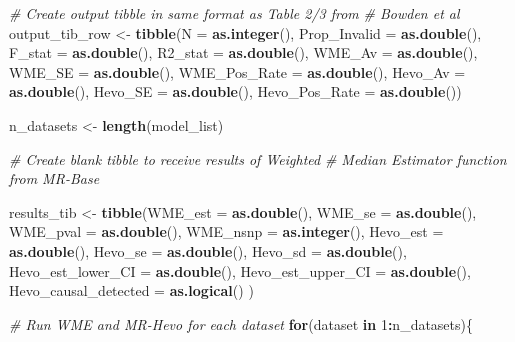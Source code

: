 \documentclass[
]{article}
\newenvironment{Shaded}{\begin{snugshade}}{\end{snugshade}}
\newcommand{\AttributeTok}[1]{\textcolor[rgb]{0.13,0.29,0.53}{#1}}
\newcommand{\CommentTok}[1]{\textcolor[rgb]{0.56,0.35,0.01}{\textit{#1}}}
\newcommand{\ControlFlowTok}[1]{\textcolor[rgb]{0.13,0.29,0.53}{\textbf{#1}}}
\newcommand{\DecValTok}[1]{\textcolor[rgb]{0.00,0.00,0.81}{#1}}
\newcommand{\FunctionTok}[1]{\textcolor[rgb]{0.13,0.29,0.53}{\textbf{#1}}}
\newcommand{\NormalTok}[1]{#1}
\newcommand{\OtherTok}[1]{\textcolor[rgb]{0.56,0.35,0.01}{#1}}
\newcommand{\SpecialCharTok}[1]{\textcolor[rgb]{0.81,0.36,0.00}{\textbf{#1}}}
\begin{document}
\begin{Shaded}
\begin{Highlighting}[]
  
  \CommentTok{\# Create output tibble in same format as Table 2/3 from}
  \CommentTok{\# Bowden et al}
\NormalTok{  output\_tib\_row }\OtherTok{\textless{}{-}} \FunctionTok{tibble}\NormalTok{(}\AttributeTok{N =} \FunctionTok{as.integer}\NormalTok{(),}
                           \AttributeTok{Prop\_Invalid =} \FunctionTok{as.double}\NormalTok{(),}
                           \AttributeTok{F\_stat =} \FunctionTok{as.double}\NormalTok{(),}
                           \AttributeTok{R2\_stat =} \FunctionTok{as.double}\NormalTok{(),}
                           \AttributeTok{WME\_Av =} \FunctionTok{as.double}\NormalTok{(),}
                           \AttributeTok{WME\_SE =} \FunctionTok{as.double}\NormalTok{(),}
                           \AttributeTok{WME\_Pos\_Rate =} \FunctionTok{as.double}\NormalTok{(),}
                           \AttributeTok{Hevo\_Av =} \FunctionTok{as.double}\NormalTok{(),}
                           \AttributeTok{Hevo\_SE =} \FunctionTok{as.double}\NormalTok{(),}
                           \AttributeTok{Hevo\_Pos\_Rate =} \FunctionTok{as.double}\NormalTok{())}
  
\NormalTok{  n\_datasets }\OtherTok{\textless{}{-}} \FunctionTok{length}\NormalTok{(model\_list)}
  
  \CommentTok{\# Create blank tibble to receive results of Weighted}
  \CommentTok{\# Median Estimator function from MR{-}Base}
  
\NormalTok{  results\_tib }\OtherTok{\textless{}{-}}  \FunctionTok{tibble}\NormalTok{(}\AttributeTok{WME\_est =} \FunctionTok{as.double}\NormalTok{(),}
                         \AttributeTok{WME\_se =} \FunctionTok{as.double}\NormalTok{(),}
                         \AttributeTok{WME\_pval =} \FunctionTok{as.double}\NormalTok{(),}
                         \AttributeTok{WME\_nsnp =} \FunctionTok{as.integer}\NormalTok{(),}
                         \AttributeTok{Hevo\_est =} \FunctionTok{as.double}\NormalTok{(),}
                         \AttributeTok{Hevo\_se =} \FunctionTok{as.double}\NormalTok{(),}
                         \AttributeTok{Hevo\_sd =} \FunctionTok{as.double}\NormalTok{(),}
                         \AttributeTok{Hevo\_est\_lower\_CI =} \FunctionTok{as.double}\NormalTok{(),}
                         \AttributeTok{Hevo\_est\_upper\_CI =} \FunctionTok{as.double}\NormalTok{(),}
                         \AttributeTok{Hevo\_causal\_detected =} \FunctionTok{as.logical}\NormalTok{()}
\NormalTok{  )}
  
  
  \CommentTok{\# Run WME and MR{-}Hevo for each dataset }
  \ControlFlowTok{for}\NormalTok{(dataset }\ControlFlowTok{in} \DecValTok{1}\SpecialCharTok{:}\NormalTok{n\_datasets)\{}
    

\end{Highlighting}
\end{Shaded}
\end{document}
